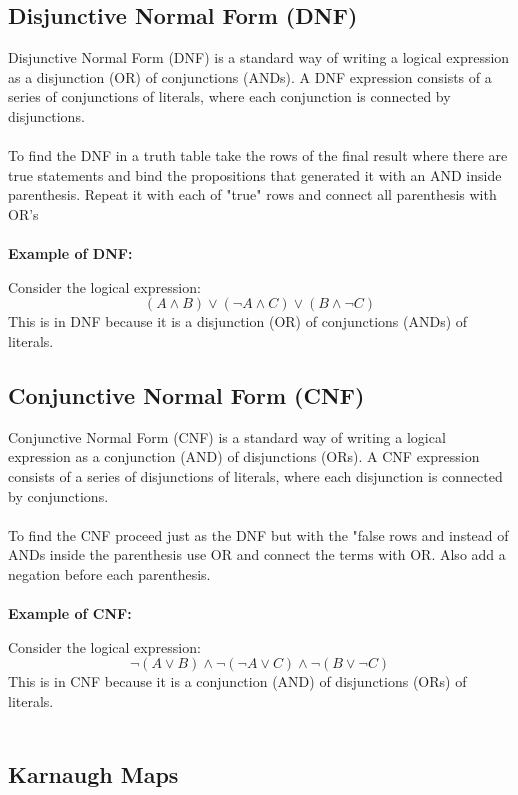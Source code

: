 \subsection{Disjunctive Normal Form (DNF)}

Disjunctive Normal Form (DNF) is a standard way of writing a logical expression as a disjunction (OR) of conjunctions (ANDs). A DNF expression consists of a series of conjunctions of literals, where each conjunction is connected by disjunctions.\\\\
To find the DNF in a truth table take the rows of the final result where there are true statements and bind the propositions that generated it with an AND inside parenthesis. Repeat it with each of "true" rows and connect all parenthesis with OR's \\\\
\textbf{Example of DNF:}

Consider the logical expression:
\[
(A \land B) \lor (\neg A \land C) \lor (B \land \neg C)
\]
This is in DNF because it is a disjunction (OR) of conjunctions (ANDs) of literals.

\subsection{Conjunctive Normal Form (CNF)}

Conjunctive Normal Form (CNF) is a standard way of writing a logical expression as a conjunction (AND) of disjunctions (ORs). A CNF expression consists of a series of disjunctions of literals, where each disjunction is connected by conjunctions.\\\\
To find the CNF proceed just as the DNF but with the "false rows and instead of ANDs inside the parenthesis use OR and connect the terms with OR. Also add a negation before each parenthesis.\\\\
\textbf{Example of CNF:}

Consider the logical expression:
\[
\neg (A \lor B) \land \neg (\neg A \lor C) \land \neg (B \lor \neg C)
\]
This is in CNF because it is a conjunction (AND) of disjunctions (ORs) of literals.\\\\

\subsection{Karnaugh Maps}

